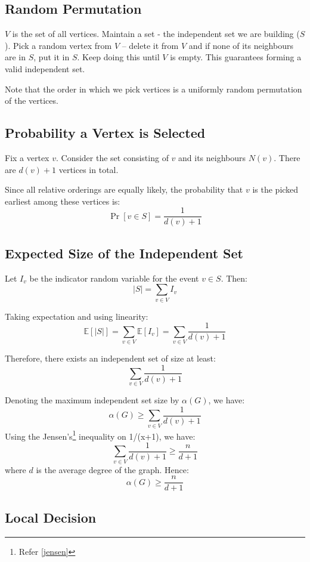 \subsection{Random Permutation}

$V$ is the set of all vertices.
Maintain a set - the independent set we are building ($S$).
Pick a random vertex from $V$ -- delete it from $V$ and if none of its neighbours are in $S$, put it in $S$.
Keep doing this until $V$ is empty. This guarantees forming a valid independent set.

Note that the order in which we pick vertices is a uniformly random permutation of the vertices.

\subsection*{Probability a Vertex is Selected}

Fix a vertex \(v\). Consider the set consisting of \(v\) and its neighbours \(N(v)\). There are \(d(v)+1\) vertices in total.

Since all relative orderings are equally likely, the probability that \(v\) is the picked earliest among these vertices is:
\[
\Pr[v \in S] = \frac{1}{d(v)+1}
\]

\subsection*{Expected Size of the Independent Set}

Let \(I_v\) be the indicator random variable for the event \(v \in S\). Then:
\[
|S| = \sum_{v \in V} I_v
\]

Taking expectation and using linearity:
\[
\mathbb{E}[|S|] = \sum_{v \in V} \mathbb{E}[I_v]
= \sum_{v \in V} \frac{1}{d(v)+1}
\]

Therefore, there exists an independent set of size at least:
\[
\sum_{v \in V} \frac{1}{d(v)+1}
\]

Denoting the maximum independent set size by \(\alpha(G)\), we have:
\[\alpha(G) \ge \sum_{v \in V} \frac{1}{d(v)+1}\]
Using the Jensen's\footnote{Refer \autoref{jensen}} inequality on 1/(x+1), we have:
\[
\sum_{v \in V} \frac{1}{d(v)+1} \ge \frac{n}{d+1}
\]
where \(d\) is the average degree of the graph. Hence:
\[
\alpha(G) \ge \frac{n}{d+1}
\]

\subsection{Local Decision}

